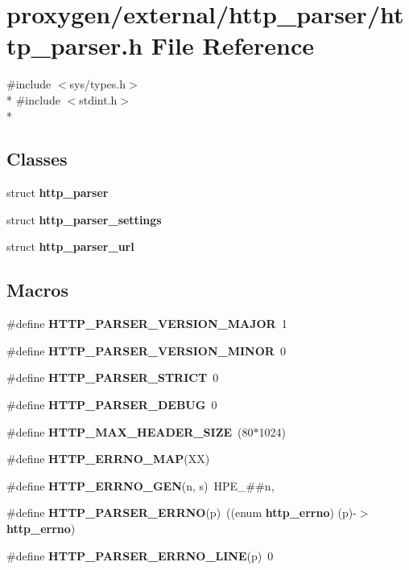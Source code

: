 \section{proxygen/external/http\+\_\+parser/http\+\_\+parser.h File Reference}
\label{http__parser_8h}
{\ttfamily \#include $<$sys/types.\+h$>$}\\*
{\ttfamily \#include $<$stdint.\+h$>$}\\*
\subsection*{Classes}
\begin{DoxyCompactItemize}
\item 
struct {\bf http\+\_\+parser}
\item 
struct {\bf http\+\_\+parser\+\_\+settings}
\item 
struct {\bf http\+\_\+parser\+\_\+url}
\end{DoxyCompactItemize}
\subsection*{Macros}
\begin{DoxyCompactItemize}
\item 
\#define {\bf H\+T\+T\+P\+\_\+\+P\+A\+R\+S\+E\+R\+\_\+\+V\+E\+R\+S\+I\+O\+N\+\_\+\+M\+A\+J\+OR}~1
\item 
\#define {\bf H\+T\+T\+P\+\_\+\+P\+A\+R\+S\+E\+R\+\_\+\+V\+E\+R\+S\+I\+O\+N\+\_\+\+M\+I\+N\+OR}~0
\item 
\#define {\bf H\+T\+T\+P\+\_\+\+P\+A\+R\+S\+E\+R\+\_\+\+S\+T\+R\+I\+CT}~0
\item 
\#define {\bf H\+T\+T\+P\+\_\+\+P\+A\+R\+S\+E\+R\+\_\+\+D\+E\+B\+UG}~0
\item 
\#define {\bf H\+T\+T\+P\+\_\+\+M\+A\+X\+\_\+\+H\+E\+A\+D\+E\+R\+\_\+\+S\+I\+ZE}~(80$\ast$1024)
\item 
\#define {\bf H\+T\+T\+P\+\_\+\+E\+R\+R\+N\+O\+\_\+\+M\+AP}(XX)
\item 
\#define {\bf H\+T\+T\+P\+\_\+\+E\+R\+R\+N\+O\+\_\+\+G\+EN}(n,  s)~H\+P\+E\+\_\+\#\#n,
\item 
\#define {\bf H\+T\+T\+P\+\_\+\+P\+A\+R\+S\+E\+R\+\_\+\+E\+R\+R\+NO}(p)~((enum {\bf http\+\_\+errno}) (p)-\/$>${\bf http\+\_\+errno})
\item 
\#define {\bf H\+T\+T\+P\+\_\+\+P\+A\+R\+S\+E\+R\+\_\+\+E\+R\+R\+N\+O\+\_\+\+L\+I\+NE}(p)~0
\end{DoxyCompactItemize}
